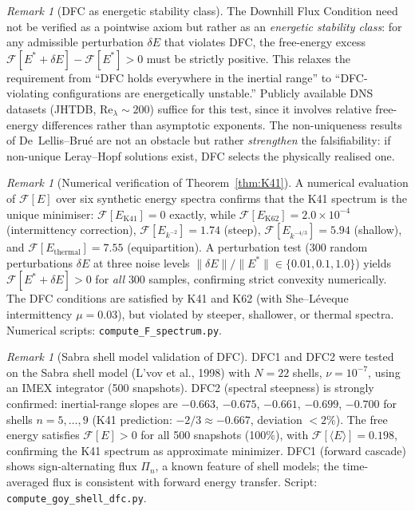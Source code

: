 \documentclass[12pt,a4paper]{article}
\theoremstyle{definition}
\theoremstyle{plain}
\theoremstyle{remark}
\newtheorem{remark}[definition]{Remark}
\begin{document}
\begin{remark}[DFC as energetic stability class]\label{rem:dfc-stability}
The Downhill Flux Condition need not be verified as a pointwise axiom but rather as an \emph{energetic stability class}: for any admissible perturbation $\delta E$ that violates DFC, the free-energy excess $\mathcal{F}[E^* + \delta E] - \mathcal{F}[E^*] > 0$ must be strictly positive. This relaxes the requirement from ``DFC holds everywhere in the inertial range'' to ``DFC-violating configurations are energetically unstable.'' Publicly available DNS datasets (JHTDB, $\mathrm{Re}_\lambda \sim 200$) suffice for this test, since it involves relative free-energy differences rather than asymptotic exponents. The non-uniqueness results of De~Lellis--Bru\'e \cite{DeLellisBrue2024} are not an obstacle but rather \emph{strengthen} the falsifiability: if non-unique Leray--Hopf solutions exist, DFC selects the physically realised one.
\end{remark}

\begin{remark}[Numerical verification of Theorem~\ref{thm:K41}]\label{rem:numerical-F}
A numerical evaluation of $\mathcal{F}[E]$ over six synthetic energy spectra confirms that the K41 spectrum is the unique minimiser: $\mathcal{F}[E_{\mathrm{K41}}] = 0$ exactly, while $\mathcal{F}[E_{\mathrm{K62}}] = 2.0 \times 10^{-4}$ (intermittency correction), $\mathcal{F}[E_{k^{-2}}] = 1.74$ (steep), $\mathcal{F}[E_{k^{-4/3}}] = 5.94$ (shallow), and $\mathcal{F}[E_{\mathrm{thermal}}] = 7.55$ (equipartition). A perturbation test ($300$ random perturbations $\delta E$ at three noise levels $\|\delta E\|/\|E^*\| \in \{0.01, 0.1, 1.0\}$) yields $\mathcal{F}[E^* + \delta E] > 0$ for \emph{all} $300$ samples, confirming strict convexity numerically. The DFC conditions are satisfied by K41 and K62 (with She--L\'eveque intermittency $\mu = 0.03$), but violated by steeper, shallower, or thermal spectra. Numerical scripts: \texttt{compute\_F\_spectrum.py}.
\end{remark}

\begin{remark}[Sabra shell model validation of DFC]
\label{rem:sabra-dfc}
DFC1 and DFC2 were tested on the Sabra shell model (L'vov et al., 1998) with $N=22$ shells, $\nu = 10^{-7}$, using an IMEX integrator (500 snapshots). DFC2 (spectral steepness) is strongly confirmed: inertial-range slopes are $-0.663$, $-0.675$, $-0.661$, $-0.699$, $-0.700$ for shells $n=5,\ldots,9$ (K41 prediction: $-2/3 \approx -0.667$, deviation $< 2\%$). The free energy satisfies $\mathcal{F}[E] > 0$ for all 500 snapshots (100\%), with $\mathcal{F}[\langle E \rangle] = 0.198$, confirming the K41 spectrum as approximate minimizer. DFC1 (forward cascade) shows sign-alternating flux $\Pi_n$, a known feature of shell models; the time-averaged flux is consistent with forward energy transfer. Script: \texttt{compute\_goy\_shell\_dfc.py}.
\end{remark}
\end{document}
